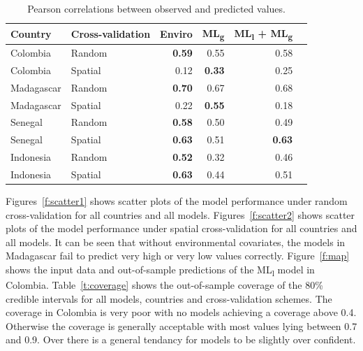 \documentclass[review]{elsarticle}
\begin{document}
\begin{table}[t!]
\caption{Pearson correlations between observed and predicted values. }
\centering
\begin{tabular}{llrrrr}
Country &  Cross-validation & Enviro &   ML\textsubscript{g} & ML\textsubscript{l} + ML\textsubscript{g} \\
\hline 
 Colombia & Random &  \textbf{0.59} &0.55 & 0.58 \\
 Colombia &  Spatial &  0.12 &  \textbf{0.33} & 0.25\\
 Madagascar &  Random &  \textbf{0.70} &  0.67 & 0.68 \\
 Madagascar &  Spatial &  0.22 &  \textbf{0.55} & 0.18\\
 Senegal &  Random &  \textbf{0.58} &  0.50 & 0.49 \\
 Senegal &  Spatial &  \textbf{0.63} & 0.51 & \textbf{0.63} \\
 Indonesia &  Random &  \textbf{0.52} & 0.32 & 0.46 \\
 Indonesia &  Spatial &  \textbf{0.63} & 0.44 & 0.51 \\
\end{tabular}
\label{t:results2}
\end{table}
Figures~\ref{f:scatter1} shows scatter plots of the model performance under random cross-validation for all countries and all models.
Figures~\ref{f:scatter2} shows scatter plots of the model performance under spatial cross-validation for all countries and all models.
It can be seen that without environmental covariates, the models in Madagascar fail to predict very high or very low values correctly.
Figure~\ref{f:map} shows the input data and out-of-sample predictions of the ML\textsubscript{l} model in Colombia.
Table~\ref{t:coverage} shows the out-of-sample coverage of the 80\% credible intervals for all models, countries and cross-validation schemes.
The coverage in Colombia is very poor with no models achieving a coverage above 0.4.
Otherwise the coverage is generally acceptable with most values lying between 0.7 and 0.9.
Over there is a general tendancy for models to be slightly over confident.
\end{document}
